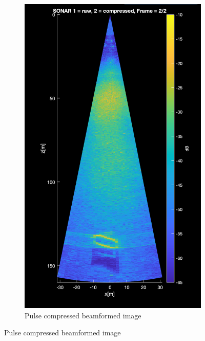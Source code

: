 \documentclass{article}
\begin{document}
\begin{figure}[ht]
\begin{subfigure}{0.3\textwidth}
        \label{fig:sub1}
    \end{subfigure}
    \hspace{0.05\textwidth}
    \begin{subfigure}{0.3\textwidth} %
        \centering
        \includegraphics[width=\linewidth]{b_compressed.png} %
        \caption{Pulse compressed beamformed image}
        \label{fig:sub2}
    \end{subfigure}
    \label{fig:main}
\end{figure}
\end{document}
